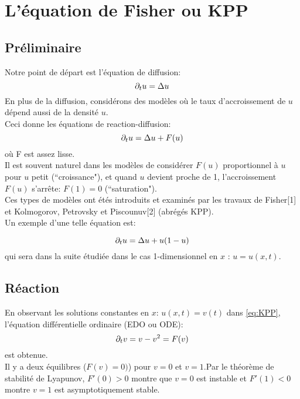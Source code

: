 

%


\section{L'équation de Fisher ou KPP}
\subsection{Préliminaire}
Notre point de départ est l'équation de diffusion:\begin{equation}\partial_t u = \Delta u  \end{equation}
En plus de la diffusion, considérons des modèles où le taux d'accroissement de $u$ dépend aussi de la densité $u$.\\
Ceci donne les équations de reaction-diffusion:
\begin{equation}\partial_t u = \Delta u + F(u) \label{eq:ReaDi} \end{equation} 
où F est assez lisse.\\
Il est souvent naturel dans les modèles de considérer $F(u)$ proportionnel à  $u$ pour $u$ petit (``croissance"), et quand $u$ devient proche de 1, l'accroissement $F(u)$ s'arrête: $F(1)=0$ (``saturation").\\
Ces types de modèles ont étés introduits et examinés par les travaux de Fisher[1] et Kolmogorov, Petrovsky et Piscounuv[2] (abrégés KPP).\\
Un exemple d'une telle équation est:

\begin{equation}
	\partial_t u = \Delta u +u(1-u) \label{eq:KPP}
\end{equation}
qui sera dans la suite étudiée dans le cas 1-dimensionnel en $x$ : $u=u(x,t)$.

\subsection{Réaction}
En observant les solutions constantes en $x$: $u(x,t)=v(t)$ dans \eqref{eq:KPP}, l'équation différentielle ordinaire (EDO ou ODE): \begin{equation}
	\partial_t v = v - v^2 = F(v)
\end{equation}
est obtenue. \\
Il y a deux équilibres ($F(v)=0)$) pour $v=0$ et $v=1$.Par le théorème de stabilité de Lyapunov, $F'(0)>0$ montre que $v=0$ est instable et $F'(1)<0$ montre $v=1$ est asymptotiquement stable.

